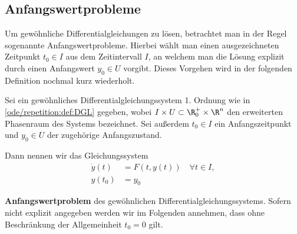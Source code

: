 \documentclass[letterpaper,10pt,english]{jupyterBook}
\begin{document}
\subsection{Anfangswertprobleme}
\label{\detokenize{ode/repetition:anfangswertprobleme}}
\par
Um gewöhnliche Differentialgleichungen zu lösen, betrachtet man in der Regel sogenannte Anfangswertprobleme.
Hierbei wählt man einen ausgezeichneten Zeitpunkt \(t_0\in I\) aus dem Zeitintervall \(I\), an welchem man die Lösung explizit durch einen Anfangswert \(y_0\in U\) vorgibt.
Dieses Vorgehen wird in der folgenden Definition nochmal kurz wiederholt.
\label{ode/repetition:def:anfangswertproblem}
\begin{definition}{}{}



\par
Sei ein gewöhnliches Differentialgleichungssystem 1. Ordnung wie in \cref{ode/repetition:def:DGL} gegeben, wobei \(I \times U \subset \R_0^+ \times \R^n\) den erweiterten Phasenraum des Systems bezeichnet.
Sei außerdem \(t_0 \in I\) ein Anfangszeitpunkt und \(y_0 \in U\) der zugehörige Anfangszustand.

\par
Dann nennen wir das Gleichungssystem
\begin{align}\label{equation:ode/repetition:eq:AWP}
\dot{y}(t) &= F(t, y(t))\quad\forall t\in I, \\
y(t_0) &= y_0
\end{align}
\par
\textbf{Anfangswertproblem} des gewöhnlichen Differentialgleichungssystems.
Sofern nicht explizit angegeben werden wir im Folgenden annehmen, dass ohne Beschränkung der Allgemeinheit \(t_0=0\) gilt.
\end{definition}
\end{document}
